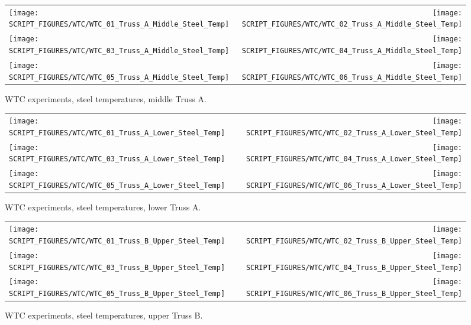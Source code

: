 \begin{figure}[p]
\begin{tabular*}{\textwidth}{l@{\extracolsep{\fill}}r}
\texttt{[image: SCRIPT\_FIGURES/WTC/WTC\_01\_Truss\_A\_Middle\_Steel\_Temp]} &
\texttt{[image: SCRIPT\_FIGURES/WTC/WTC\_02\_Truss\_A\_Middle\_Steel\_Temp]} \\
\texttt{[image: SCRIPT\_FIGURES/WTC/WTC\_03\_Truss\_A\_Middle\_Steel\_Temp]} &
\texttt{[image: SCRIPT\_FIGURES/WTC/WTC\_04\_Truss\_A\_Middle\_Steel\_Temp]} \\
\texttt{[image: SCRIPT\_FIGURES/WTC/WTC\_05\_Truss\_A\_Middle\_Steel\_Temp]} &
\texttt{[image: SCRIPT\_FIGURES/WTC/WTC\_06\_Truss\_A\_Middle\_Steel\_Temp]}
\end{tabular*}
\caption{WTC experiments, steel temperatures, middle Truss A.}
\label{NIST_WTC_Truss_A_Middle_Steel_Temp}
\end{figure}

\begin{figure}[p]
\begin{tabular*}{\textwidth}{l@{\extracolsep{\fill}}r}
\texttt{[image: SCRIPT\_FIGURES/WTC/WTC\_01\_Truss\_A\_Lower\_Steel\_Temp]} &
\texttt{[image: SCRIPT\_FIGURES/WTC/WTC\_02\_Truss\_A\_Lower\_Steel\_Temp]} \\
\texttt{[image: SCRIPT\_FIGURES/WTC/WTC\_03\_Truss\_A\_Lower\_Steel\_Temp]} &
\texttt{[image: SCRIPT\_FIGURES/WTC/WTC\_04\_Truss\_A\_Lower\_Steel\_Temp]} \\
\texttt{[image: SCRIPT\_FIGURES/WTC/WTC\_05\_Truss\_A\_Lower\_Steel\_Temp]} &
\texttt{[image: SCRIPT\_FIGURES/WTC/WTC\_06\_Truss\_A\_Lower\_Steel\_Temp]}
\end{tabular*}
\caption{WTC experiments, steel temperatures, lower Truss A.}
\label{NIST_WTC_Truss_A_Lower_Steel_Temp}
\end{figure}

\begin{figure}[p]
\begin{tabular*}{\textwidth}{l@{\extracolsep{\fill}}r}
\texttt{[image: SCRIPT\_FIGURES/WTC/WTC\_01\_Truss\_B\_Upper\_Steel\_Temp]} &
\texttt{[image: SCRIPT\_FIGURES/WTC/WTC\_02\_Truss\_B\_Upper\_Steel\_Temp]} \\
\texttt{[image: SCRIPT\_FIGURES/WTC/WTC\_03\_Truss\_B\_Upper\_Steel\_Temp]} &
\texttt{[image: SCRIPT\_FIGURES/WTC/WTC\_04\_Truss\_B\_Upper\_Steel\_Temp]} \\
\texttt{[image: SCRIPT\_FIGURES/WTC/WTC\_05\_Truss\_B\_Upper\_Steel\_Temp]} &
\texttt{[image: SCRIPT\_FIGURES/WTC/WTC\_06\_Truss\_B\_Upper\_Steel\_Temp]}
\end{tabular*}
\caption{WTC experiments, steel temperatures, upper Truss B.}
\label{NIST_WTC_Truss_B_Upper_Steel_Temp}
\end{figure}

